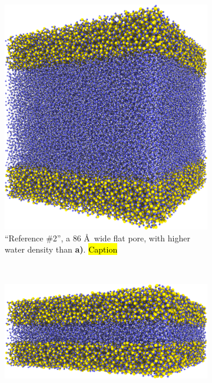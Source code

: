 \begin{figure}[htpb]
\begin{subfigure}[t]{\myfigwidth}
        \includegraphics[width=\textwidth]{images/systems/trimmed-flat_square_fracture03_04}%
        \caption{%
            ``Reference \#2'', a 86 \AA\ wide flat pore, with higher water density than \textbf{a)}. \hl{Caption} %
        }%
        \label{fig:renderings_flat_square_fracture03}%
    \end{subfigure}%
    \vspace{10pt}\\%
    \begin{subfigure}[t]{\myfigwidth}%
        \centering%
        \includegraphics[width=\textwidth]{images/systems/trimmed-flat_fracture02_03}%

\end{subfigure}
\end{figure}
